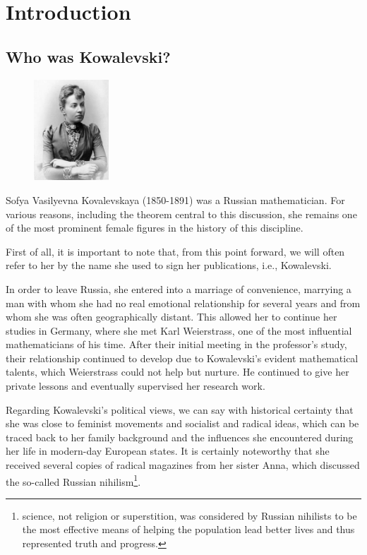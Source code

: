 \chapter{Introduction}

\section{Who was Kowalevski?}
\begin{figure}
    \centering
    \includegraphics[width=0.25\textwidth]{kovalevskaya_8}
\end{figure}

Sofya Vasilyevna Kovalevskaya (1850-1891) was a Russian mathematician. For various reasons, including the theorem central to this discussion, she remains one of the most prominent female figures in the history of this discipline.

First of all, it is important to note that, from this point forward, we will often refer to her by the name she used to sign her publications, i.e., Kowalevski.

In order to leave Russia, she entered into a marriage of convenience, marrying a man with whom she had no real emotional relationship for several years and from whom she was often geographically distant.
This allowed her to continue her studies in Germany, where she met Karl Weierstrass, one of the most influential mathematicians of his time.
After their initial meeting in the professor's study, their relationship continued to develop due to Kowalevski's evident mathematical talents, which Weierstrass could not help but nurture. He continued to give her private lessons and eventually supervised her research work.

Regarding Kowalevski's political views, we can say with historical certainty that she was close to feminist movements and socialist and radical ideas, which can be traced back to her family background and the influences she encountered during her life in modern-day European states. It is certainly noteworthy that she received several copies of radical magazines from her sister Anna, which discussed the so-called Russian nihilism\footnote{science, not religion or superstition, was considered by Russian nihilists to be the most effective means of helping the population lead better lives and thus represented truth and progress.}.

